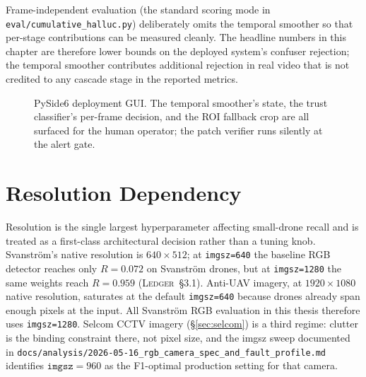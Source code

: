 \documentclass[12pt,a4paper,oneside,openright]{book}
\begin{document}
Frame-independent evaluation (the standard scoring mode in \texttt{eval/cumulative\_halluc.py}) deliberately omits the temporal smoother so that per-stage contributions can be measured cleanly. The headline numbers in this chapter are therefore lower bounds on the deployed system's confuser rejection; the temporal smoother contributes additional rejection in real video that is not credited to any cascade stage in the reported metrics.

\begin{figure}[htbp]
    \centering
    \caption{PySide6 deployment GUI. The temporal smoother's state, the trust classifier's per-frame decision, and the ROI fallback crop are all surfaced for the human operator; the patch verifier runs silently at the alert gate.}
    \label{fig:pyside_gui}
\end{figure}

\section{Resolution Dependency}
\label{sec:resolution_arch}

Resolution is the single largest hyperparameter affecting small-drone recall and is treated as a first-class architectural decision rather than a tuning knob. Svanstr\"om's native resolution is $640\times 512$; at \texttt{imgsz=640} the baseline RGB detector reaches only $R=0.072$ on Svanstr\"om drones, but at \texttt{imgsz=1280} the same weights reach $R=0.959$ (\textsc{Ledger}~\S3.1). Anti-UAV imagery, at $1920\times 1080$ native resolution, saturates at the default \texttt{imgsz=640} because drones already span enough pixels at the input. All Svanstr\"om RGB evaluation in this thesis therefore uses \texttt{imgsz=1280}. Selcom CCTV imagery (\S\ref{sec:selcom}) is a third regime: clutter is the binding constraint there, not pixel size, and the imgsz sweep documented in \texttt{docs/analysis/2026-05-16\_rgb\_camera\_spec\_and\_fault\_profile.md} identifies $\mathtt{imgsz}=960$ as the F1-optimal production setting for that camera.
\end{document}
